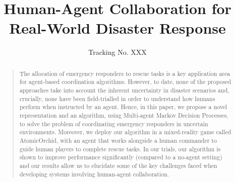 \documentclass[letterpaper]{article}
\begin{document}
 \def\baselinestretch{0.9}
%

\title{Human-Agent Collaboration for Real-World Disaster Response}
\author{Tracking No. XXX}

 \maketitle

\begin{abstract}
\begin{quote}
The allocation of emergency responders to rescue tasks is a key application area for agent-based coordination algorithms. However, to date, none of the proposed approaches take into account the inherent uncertainty  in disaster scenarios and, crucially, none have been field-trialled in order to understand how humans perform when instructed by an agent. Hence, in this paper, we propose a novel representation and an algorithm, using Multi-agent Markov Decision Processes, to solve the problem of  coordinating emergency responders in uncertain environments. Moreover,  we deploy our algorithm in a mixed-reality game called AtomicOrchid, with an agent that works alongside a human commander to guide human players to complete rescue tasks. In our  trials, our algorithm is shown to improve  performance significantly (compared to a no-agent setting) and our results allow us to elucidate some of the key challenges faced when developing systems involving human-agent collaboration.
\end{quote}
 \end{abstract}\vspace{-3mm}






\vspace{-2mm}



\newpage

\fontsize{9.5pt}{10.5pt}
{


}
\end{document}
